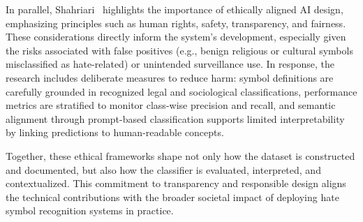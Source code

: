 In parallel, Shahriari~\parencite{ieee2021ethics} highlights the importance of ethically aligned AI design,
emphasizing principles such as human rights, safety, transparency, and fairness. These considerations directly
inform the system’s development, especially given the risks associated with false positives (e.g., benign religious
or cultural symbols misclassified as hate-related) or unintended surveillance use. In response, the research
includes deliberate measures to reduce harm: symbol definitions are carefully grounded in recognized legal and
sociological classifications, performance metrics are stratified to monitor class-wise precision and recall, and
semantic alignment through prompt-based classification supports limited interpretability by linking predictions to
human-readable concepts.

Together, these ethical frameworks shape not only how the dataset is constructed and documented, but also how the
classifier is evaluated, interpreted, and contextualized. This commitment to transparency and responsible design
aligns the technical contributions with the broader societal impact of deploying hate symbol recognition systems in
practice.
